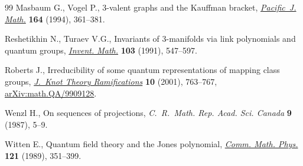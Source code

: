 \documentclass[11pt]{article}
\numberwithin{equation}{section}
\begin{document}
\begin{thebibliography}{99}
Masbaum G., Vogel P., {$3$}-valent graphs and the {K}auffman bracket,
 \href{https://doi.org/10.2140/pjm.1994.164.361}{\textit{Pacific~J. Math.}} \textbf{164} (1994), 361--381.

Reshetikhin N., Turaev V.G., Invariants of {$3$}-manifolds via link polynomials
 and quantum groups, \href{https://doi.org/10.1007/BF01239527}{\textit{Invent. Math.}} \textbf{103} (1991), 547--597.

Roberts J., Irreducibility of some quantum representations of mapping class
 groups, \href{https://doi.org/10.1142/S021821650100113X}{\textit{J.~Knot Theory Ramifications}} \textbf{10} (2001), 763--767,
 \href{https://arxiv.org/abs/math.QA/9909128}{arXiv:math.QA/9909128}.

Wenzl H., On sequences of projections, \textit{C.~R.~Math. Rep. Acad. Sci.
 Canada} \textbf{9} (1987), 5--9.

Witten E., Quantum field theory and the {J}ones polynomial, \href{http://dx.doi.org/10.1007/BF01217730}{\textit{Comm. Math.
 Phys.}} \textbf{121} (1989), 351--399.

\end{thebibliography}
\end{document}
